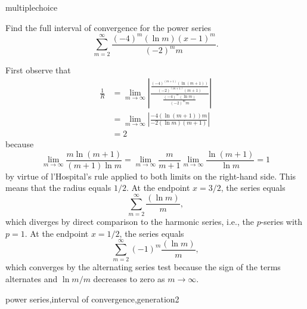 \documentclass{ximera}
\begin{document}
\begin{question}[PowerSerInterval003]
\begin{type}
multiplechoice
\end{type}
Find the full interval of convergence for the power series \[\sum_{m=2}^{\infty} \frac{(-4)^m(\ln m)(x - 1)^m }{(-2)^mm}.\]
\begin{multiplechoice}
\choice[correct]{\(\displaystyle \left[\frac{1}{2},\frac{3}{2}\right)\)}
\choice{\(\displaystyle \left(-1,3\right]\)}
\choice{\(\displaystyle \left[-1,3\right]\)}
\choice{\(\displaystyle \left(-\infty,\infty\right)\)}
\end{multiplechoice}
\begin{feedback}
First observe that 
\[\begin{aligned}
\frac{1}{R} & = \lim_{m\rightarrow \infty} \left| \frac{\frac{(-4)^{(m+1)}(\ln {(m+1)}) }{(-2)^{(m+1)}{(m+1)}} }{\frac{(-4)^m(\ln m) }{(-2)^mm}} \right| \\
& = \lim_{m\rightarrow \infty} \left| \frac{-4(\ln {(m+1)})m }{-2(\ln m){(m+1)} } \right| \\
& = 2
\end{aligned}\]
because \[\lim_{m \rightarrow \infty} \frac{m\ln (m+1)}{(m+1) \ln m} = \lim_{m \rightarrow \infty} \frac{m}{m+1} \lim_{m \rightarrow \infty} \frac{\ln (m+1)}{\ln m} = 1\] by virtue of l'Hospital's rule applied to both limits on the right-hand side.
This means that the radius equals \(1/2\). At the endpoint \(x=3/2\), the series equals \[\sum_{m=2}^{\infty} \frac{(\ln m) }{m },\] which diverges by direct comparison to the harmonic series, i.e., the \(p\)-series with \(p = 1\). At the endpoint \(x=1/2\), the series equals \[\sum_{m=2}^{\infty} (-1)^m\frac{(\ln m) }{m },\] which converges by the alternating series test because the sign of the terms alternates and \(\ln m / m\) decreases to zero as \(m \rightarrow \infty\).
\end{feedback}
\begin{keywords}
power series,interval of convergence,generation2
\end{keywords}
\end{question}
\end{document}
